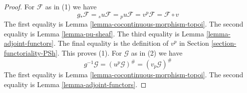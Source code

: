 \documentclass[10pt,a4paper]{amsart}
\theoremstyle{plain}
\theoremstyle{definition}
\theoremstyle{remark}
\numberwithin{equation}{subsection}
\begin{document}
\begin{proof}
For $\mathcal{F}$ as in (1) we have
$$
g_*\mathcal{F} =
{}_su\mathcal{F} =
{}_pu\mathcal{F} =
v^p\mathcal{F} =
\mathcal{F} \circ v
$$
The first equality is Lemma \ref{lemma-cocontinuous-morphism-topoi}.
The second equality is Lemma \ref{lemma-pu-sheaf}.
The third equality is Lemma \ref{lemma-adjoint-functors}.
The final equality is the definition of $v^p$ in
Section \ref{section-functoriality-PSh}. This proves (1).
For $\mathcal{G}$ as in (2) we have
$$
g^{-1}\mathcal{G} = (u^p\mathcal{G})^\# = (v_p\mathcal{G})^\#
$$
The first equality is Lemma \ref{lemma-cocontinuous-morphism-topoi}.
The second equality is Lemma \ref{lemma-adjoint-functors}.
\end{proof}
\end{document}
